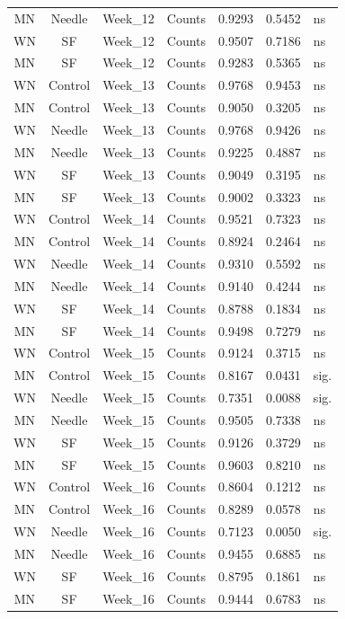 \documentclass[
  12pt,
  letterpaper,
]{article}
\begin{document}
\begin{longtable}{ccclrrl}
MN & Needle & Week\_12 & Counts & 0.9293 & 0.5452 & ns \\ 
WN & SF & Week\_12 & Counts & 0.9507 & 0.7186 & ns \\ 
MN & SF & Week\_12 & Counts & 0.9283 & 0.5365 & ns \\ 
WN & Control & Week\_13 & Counts & 0.9768 & 0.9453 & ns \\ 
MN & Control & Week\_13 & Counts & 0.9050 & 0.3205 & ns \\ 
WN & Needle & Week\_13 & Counts & 0.9768 & 0.9426 & ns \\ 
MN & Needle & Week\_13 & Counts & 0.9225 & 0.4887 & ns \\ 
WN & SF & Week\_13 & Counts & 0.9049 & 0.3195 & ns \\ 
MN & SF & Week\_13 & Counts & 0.9002 & 0.3323 & ns \\ 
WN & Control & Week\_14 & Counts & 0.9521 & 0.7323 & ns \\ 
MN & Control & Week\_14 & Counts & 0.8924 & 0.2464 & ns \\ 
WN & Needle & Week\_14 & Counts & 0.9310 & 0.5592 & ns \\ 
MN & Needle & Week\_14 & Counts & 0.9140 & 0.4244 & ns \\ 
WN & SF & Week\_14 & Counts & 0.8788 & 0.1834 & ns \\ 
MN & SF & Week\_14 & Counts & 0.9498 & 0.7279 & ns \\ 
WN & Control & Week\_15 & Counts & 0.9124 & 0.3715 & ns \\ 
MN & Control & Week\_15 & Counts & 0.8167 & 0.0431 & sig. \\ 
WN & Needle & Week\_15 & Counts & 0.7351 & 0.0088 & sig. \\ 
MN & Needle & Week\_15 & Counts & 0.9505 & 0.7338 & ns \\ 
WN & SF & Week\_15 & Counts & 0.9126 & 0.3729 & ns \\ 
MN & SF & Week\_15 & Counts & 0.9603 & 0.8210 & ns \\ 
WN & Control & Week\_16 & Counts & 0.8604 & 0.1212 & ns \\ 
MN & Control & Week\_16 & Counts & 0.8289 & 0.0578 & ns \\ 
WN & Needle & Week\_16 & Counts & 0.7123 & 0.0050 & sig. \\ 
MN & Needle & Week\_16 & Counts & 0.9455 & 0.6885 & ns \\ 
WN & SF & Week\_16 & Counts & 0.8795 & 0.1861 & ns \\ 
MN & SF & Week\_16 & Counts & 0.9444 & 0.6783 & ns \\ 

\end{longtable}
\end{document}
